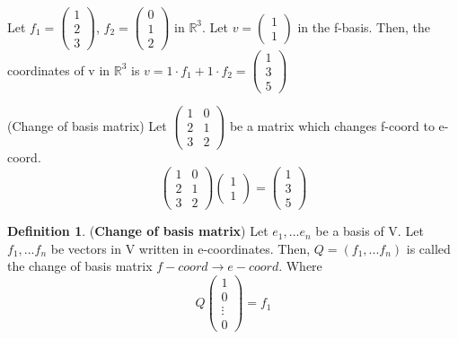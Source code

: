 \documentclass[12pt]{article}
\theoremstyle{definition}
\newtheorem{definition}{Definition}[section]
\theoremstyle{remark}
\begin{document}
\begin{example}
    Let $f_1 = \begin{pmatrix}
        1\\2\\3
    \end{pmatrix}$, $f_2= \begin{pmatrix}
        0\\1\\2
    \end{pmatrix}$ in $\mathbb{R}^3$. Let $v = \begin{pmatrix}1 \\ 1 \end{pmatrix}$ in the f-basis. Then, the coordinates of
    v in $\mathbb{R}^3$ is $v= 1 \cdot f_1 + 1 \cdot f_2 = \begin{pmatrix} 1\\3\\5 \end{pmatrix}$
\end{example}
\begin{example}(Change of basis matrix)
    Let $\begin{pmatrix}
        1 & 0 \\ 2&1 \\ 3&2 
    \end{pmatrix}$ be a matrix which changes f-coord to e-coord. 
    $$\begin{pmatrix}
        1 & 0 \\ 2&1 \\ 3&2 
    \end{pmatrix} \begin{pmatrix}
        1\\1
    \end{pmatrix} = \begin{pmatrix}
        1\\3\\5 
    \end{pmatrix}$$

\end{example}
\begin{definition}(\textbf{Change of basis matrix})
    Let $e_1, ... e_n $ be a basis of V. Let  $f_1, ... f_n $ be vectors in V written in e-coordinates. Then, $Q=( f_1, ... f_n )$ is 
    called the change of basis matrix $f-coord\rightarrow e-coord$. Where $$Q\begin{pmatrix}
        1 \\ 0\\ \vdots \\ 0 
    \end{pmatrix} = f_1$$
\end{definition}
\end{document}
